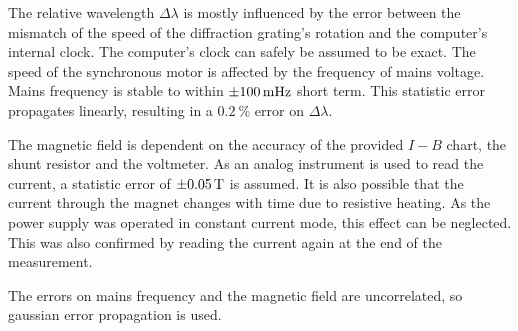 The relative wavelength $\Delta \lambda$ is mostly influenced by the error between the mismatch of the speed of the diffraction grating's rotation and the computer's internal clock.
The computer's clock can safely be assumed to be exact.
The speed of the synchronous motor is affected by the frequency of mains voltage.
Mains frequency is stable to within $\SI{\pm 100}{\milli\hertz}$ short term.
This statistic error propagates linearly, resulting in a $\SI{0.2}{\percent}$ error on $\Delta\lambda$.

The magnetic field is dependent on the accuracy of the provided $I-B$ chart, the shunt resistor and the voltmeter.
As an analog instrument is used to read the current, a statistic error of $\SI{\pm 0.05}{\tesla}$ is assumed.
It is also possible that the current through the magnet changes with time due to resistive heating.
As the power supply was operated in constant current mode, this effect can be neglected.
This was also confirmed by reading the current again at the end of the measurement.

The errors on mains frequency and the magnetic field are uncorrelated, so gaussian error propagation is used. 
